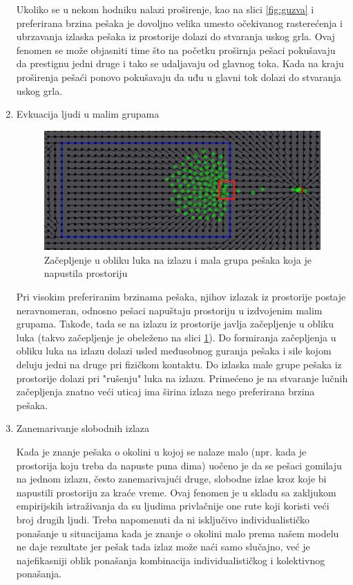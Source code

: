 \documentclass[12pt]{article}
\begin{document}
\begin{enumerate}
Ukoliko se u nekom hodniku nalazi proširenje, kao na slici \ref{fig:guzva} i preferirana brzina pešaka je dovoljno velika umesto očekivanog rasterećenja i ubrzavanja izlaska pešaka iz prostorije dolazi do stvaranja uskog grla. Ovaj fenomen se može objasniti time što na početku proširnja pešaci pokušavaju da prestignu jedni druge i tako se udaljavaju od glavnog toka. Kada na kraju proširenja pešaći ponovo pokušavaju da uđu u glavni tok dolazi do stvaranja uskog grla.

\item Evkuacija ljudi u malim grupama

\begin{figure}
\centering
\includegraphics{SCGrupa1}
\caption{Začepljenje u obliku luka na izlazu i mala grupa pešaka koja je napustila prostoriju}
\label{fig:grupa}
\end{figure}


Pri visokim preferiranim brzinama pešaka, njihov izlazak iz prostorije postaje neravnomeran, odnosno pešaci napuštaju prostoriju u izdvojenim malim grupama. Takođe, tada se na izlazu iz prostorije javlja začepljenje u obliku luka (takvo začepljenje je obeleženo na slici \ref{fig:grupa}). Do formiranja začepljenja u obliku luka na izlazu dolazi usled međusobnog guranja pešaka i sile kojom deluju jedni na druge pri fizičkom kontaktu. Do izlaska male grupe pešaka iz prostorije dolazi pri "rušenju" luka na izlazu. Primećeno je na stvaranje lučnih začepljenja znatno veći uticaj ima širina izlaza nego preferirana brzina pešaka.

\item Zanemarivanje slobodnih izlaza

Kada je znanje pešaka o okolini u kojoj se nalaze malo (npr. kada je prostorija koju treba da napuste puna dima) uočeno je da se pešaci gomilaju na jednom izlazu, često zanemarivajući druge, slobodne izlae kroz koje bi napustili prostoriju za kraće vreme. Ovaj fenomen je u skladu sa zakljukom empirijskih istraživanja da su ljudima privlačnije one rute koji koristi veći broj drugih ljudi. Treba napomenuti da ni isključivo individualističko ponašanje u situacijama kada je znanje o okolini malo prema našem modelu ne daje rezultate jer pešak tada izlaz može naći samo slučajno, već je najefikasniji oblik ponašanja kombinacija individualističkog i kolektivnog ponašanja.


\end{enumerate}
    
\end{document}
